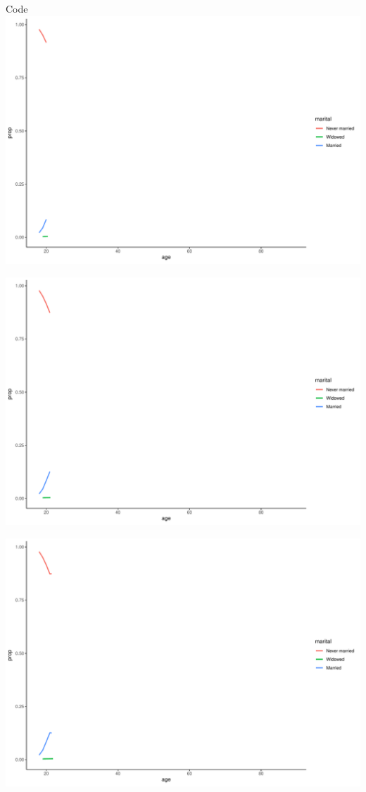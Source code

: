 \documentclass[
  ignorenonframetext,
]{beamer}
\begin{document}
\begin{frame}[fragile]{Code}
\includegraphics{gss_cat_files/figure-beamer/unnamed-chunk-1-8.pdf}

\includegraphics{gss_cat_files/figure-beamer/unnamed-chunk-1-9.pdf}

\includegraphics{gss_cat_files/figure-beamer/unnamed-chunk-1-10.pdf}


\end{frame}
\end{document}

